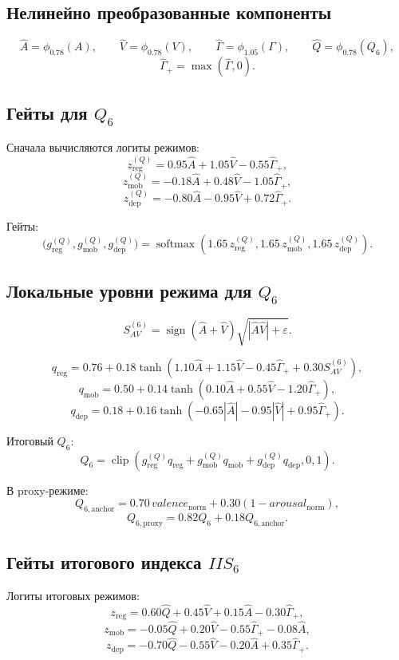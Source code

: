 \documentclass[12pt,a4paper]{article}
\begin{document}
\subsection{Нелинейно преобразованные компоненты}
\[
\widehat{A}=\phi_{0.78}(A),\qquad
\widehat{V}=\phi_{0.78}(V),\qquad
\widehat{\Gamma}=\phi_{1.05}(\Gamma),\qquad
\widehat{Q}=\phi_{0.78}(Q_6),
\]
\[
\widehat{\Gamma}_+=\max(\widehat{\Gamma},0).
\]

\subsection{Гейты для \(Q_6\)}
Сначала вычисляются логиты режимов:
\[
z^{(Q)}_{\mathrm{reg}}=0.95\widehat{A}+1.05\widehat{V}-0.55\widehat{\Gamma}_+,
\]
\[
z^{(Q)}_{\mathrm{mob}}=-0.18\widehat{A}+0.48\widehat{V}-1.05\widehat{\Gamma}_+,
\]
\[
z^{(Q)}_{\mathrm{dep}}=-0.80\widehat{A}-0.95\widehat{V}+0.72\widehat{\Gamma}_+.
\]

Гейты:
\[
\bigl(g^{(Q)}_{\mathrm{reg}},g^{(Q)}_{\mathrm{mob}},g^{(Q)}_{\mathrm{dep}}\bigr)
=
\operatorname{softmax}\!\left(
1.65\,z^{(Q)}_{\mathrm{reg}},
1.65\,z^{(Q)}_{\mathrm{mob}},
1.65\,z^{(Q)}_{\mathrm{dep}}
\right).
\]

\subsection{Локальные уровни режима для \(Q_6\)}
\[
S_{AV}^{(6)}=\operatorname{sign}(\widehat{A}+\widehat{V})\sqrt{|\widehat{A}\widehat{V}|+\varepsilon}.
\]

\[
q_{\mathrm{reg}}=
0.76+0.18\tanh\!\left(
1.10\widehat{A}+1.15\widehat{V}-0.45\widehat{\Gamma}_++0.30S_{AV}^{(6)}
\right),
\]
\[
q_{\mathrm{mob}}=
0.50+0.14\tanh\!\left(
0.10\widehat{A}+0.55\widehat{V}-1.20\widehat{\Gamma}_+
\right),
\]
\[
q_{\mathrm{dep}}=
0.18+0.16\tanh\!\left(
-0.65|\widehat{A}|-0.95|\widehat{V}|+0.95\widehat{\Gamma}_+
\right).
\]

Итоговый \(Q_6\):
\[
Q_6=
\operatorname{clip}\!\left(
g^{(Q)}_{\mathrm{reg}}q_{\mathrm{reg}}
+g^{(Q)}_{\mathrm{mob}}q_{\mathrm{mob}}
+g^{(Q)}_{\mathrm{dep}}q_{\mathrm{dep}},
0,1
\right).
\]

В proxy-режиме:
\[
Q_{6,\mathrm{anchor}}=0.70\,valence_{\mathrm{norm}}+0.30(1-arousal_{\mathrm{norm}}),
\]
\[
Q_{6,\mathrm{proxy}}=0.82Q_6+0.18Q_{6,\mathrm{anchor}}.
\]

\subsection{Гейты итогового индекса \(IIS_6\)}
Логиты итоговых режимов:
\[
z_{\mathrm{reg}}=0.60\widehat{Q}+0.45\widehat{V}+0.15\widehat{A}-0.30\widehat{\Gamma}_+,
\]
\[
z_{\mathrm{mob}}=-0.05\widehat{Q}+0.20\widehat{V}-0.55\widehat{\Gamma}_+-0.08\widehat{A},
\]
\[
z_{\mathrm{dep}}=-0.70\widehat{Q}-0.55\widehat{V}-0.20\widehat{A}+0.35\widehat{\Gamma}_+.
\]
\end{document}
